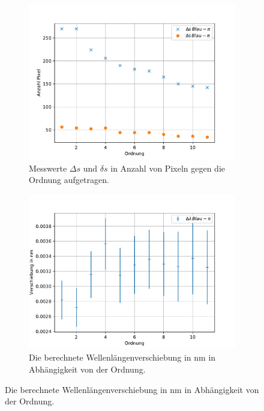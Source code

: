 \begin{figure}
    \begin{subfigure}{0.48\textwidth}
        \centering
        \includegraphics{content/data/blau_pi_messwerte.pdf}
        \caption{Messwerte $\Delta s$ und $\delta s$ in Anzahl von Pixeln gegen die Ordnung aufgetragen.}
        \label{subfig:blau_pi_mess}
    \end{subfigure}
    \hfill
    \begin{subfigure}{0.48\textwidth}
        \centering
        \includegraphics{content/data/blau_pi_verschiebung.pdf}
        \caption{Die berechnete Wellenlängenverschiebung in $\si{\nano\meter}$ in Abhängigkeit von der Ordnung.}
        \label{subfig:blau_pi_versch}
    \end{subfigure}
    \label{fig:blau_pi_mess_versch}
\end{figure}

